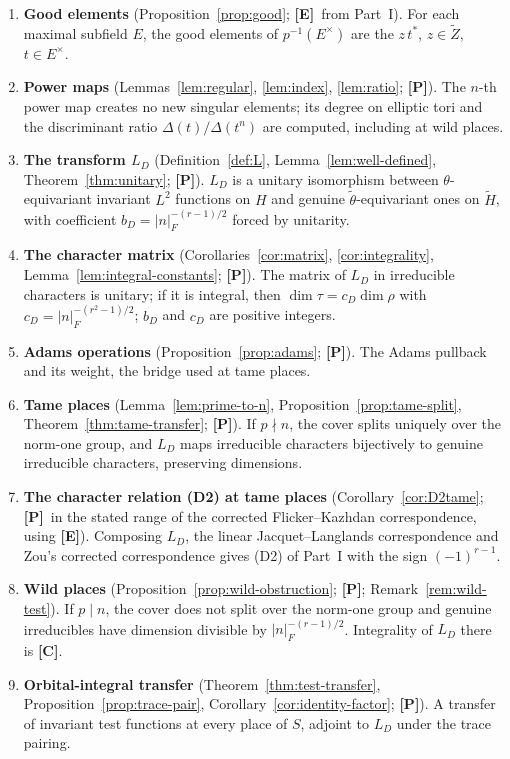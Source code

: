 \documentclass[11pt]{article}
\newcommand{\tH}{\widetilde H}
\newcommand{\tZ}{\widetilde Z}
\newcommand{\Ptag}{\textnormal{\textbf{[P]}}}
\newcommand{\Etag}{\textnormal{\textbf{[E]}}}
\newcommand{\Ctag}{\textnormal{\textbf{[C]}}}
\theoremstyle{plain}
\theoremstyle{definition}
\begin{document}
\begin{enumerate}[leftmargin=*,label=\arabic*.]
\item \textbf{Good elements} (Proposition~\ref{prop:good}; \Etag\ from Part~I). For each maximal subfield $E$, the good elements of $p^{-1}(E^\times)$ are the $z\,t^*$, $z\in\tZ$, $t\in E^\times$.
\item \textbf{Power maps} (Lemmas~\ref{lem:regular}, \ref{lem:index}, \ref{lem:ratio}; \Ptag). The $n$-th power map creates no new singular elements; its degree on elliptic tori and the discriminant ratio $\Delta(t)/\Delta(t^n)$ are computed, including at wild places.
\item \textbf{The transform $L_D$} (Definition~\ref{def:L}, Lemma~\ref{lem:well-defined}, Theorem~\ref{thm:unitary}; \Ptag). $L_D$ is a unitary isomorphism between $\theta$-equivariant invariant $L^2$ functions on $H$ and genuine $\tilde\theta$-equivariant ones on $\tH$, with coefficient $b_D=|n|_F^{-(r-1)/2}$ forced by unitarity.
\item \textbf{The character matrix} (Corollaries~\ref{cor:matrix}, \ref{cor:integrality}, Lemma~\ref{lem:integral-constants}; \Ptag). The matrix of $L_D$ in irreducible characters is unitary; if it is integral, then $\dim\tau=c_D\dim\rho$ with $c_D=|n|_F^{-(r^2-1)/2}$; $b_D$ and $c_D$ are positive integers.
\item \textbf{Adams operations} (Proposition~\ref{prop:adams}; \Ptag). The Adams pullback and its weight, the bridge used at tame places.
\item \textbf{Tame places} (Lemma~\ref{lem:prime-to-n}, Proposition~\ref{prop:tame-split}, Theorem~\ref{thm:tame-transfer}; \Ptag). If $p\nmid n$, the cover splits uniquely over the norm-one group, and $L_D$ maps irreducible characters bijectively to genuine irreducible characters, preserving dimensions.
\item \textbf{The character relation (D2) at tame places} (Corollary~\ref{cor:D2tame}; \Ptag\ in the stated range of the corrected Flicker--Kazhdan correspondence, using \Etag). Composing $L_D$, the linear Jacquet--Langlands correspondence and Zou's corrected correspondence gives (D2) of Part~I with the sign $(-1)^{r-1}$.
\item \textbf{Wild places} (Proposition~\ref{prop:wild-obstruction}; \Ptag; Remark~\ref{rem:wild-test}). If $p\mid n$, the cover does not split over the norm-one group and genuine irreducibles have dimension divisible by $|n|_F^{-(r-1)/2}$. Integrality of $L_D$ there is \Ctag.
\item \textbf{Orbital-integral transfer} (Theorem~\ref{thm:test-transfer}, Proposition~\ref{prop:trace-pair}, Corollary~\ref{cor:identity-factor}; \Ptag). A transfer of invariant test functions at every place of $S$, adjoint to $L_D$ under the trace pairing.

\end{enumerate}
\end{document}
